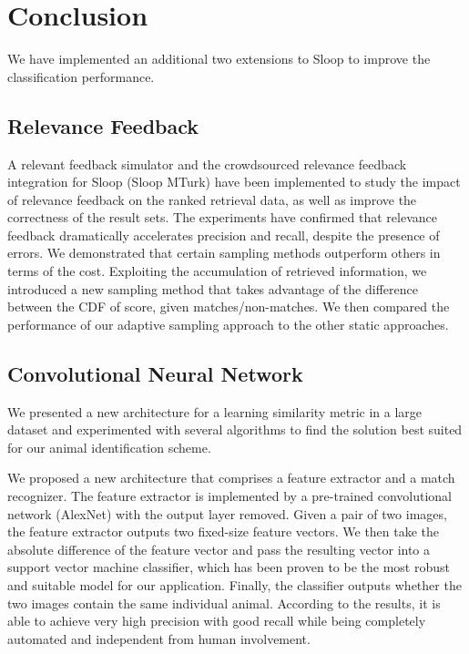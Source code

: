 \chapter{Conclusion}

We have implemented an additional two extensions to Sloop to improve the
classification performance.

\section{Relevance Feedback}
A relevant feedback simulator and the crowdsourced
relevance feedback integration for Sloop (Sloop MTurk) have been implemented to
study the impact of relevance feedback on the ranked retrieval data, as well as
improve the correctness of the result sets. The experiments have confirmed that
relevance feedback dramatically accelerates precision and recall, despite the
presence of errors. We demonstrated that certain sampling methods outperform others in terms
of the cost. Exploiting the accumulation of retrieved information, we
introduced a new sampling method that takes advantage of the difference between
the CDF of score, given matches/non-matches. We then compared the performance of
our adaptive sampling approach to the other static approaches.

\section{Convolutional Neural Network}

We presented a new architecture for a learning similarity metric in a large
dataset and experimented with several algorithms to find the solution best
suited for our animal identification scheme. 

We proposed a new architecture that comprises a feature extractor and a match
recognizer. The feature extractor is implemented by a pre-trained convolutional
network (AlexNet) with the output layer removed. Given a pair of two images,
the feature extractor outputs two fixed-size feature vectors. We then take the
absolute difference of the feature vector and pass the resulting vector into a
support vector machine classifier, which has been proven to be the most robust and
suitable model for our application. Finally, the classifier outputs whether the
two images contain the same individual animal. According to the results, it
is able to achieve very high precision with good recall while being completely
automated and independent from human involvement. 

